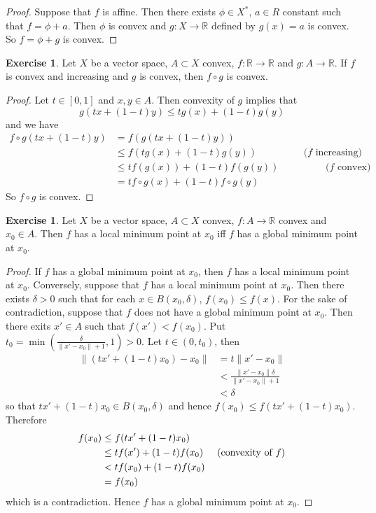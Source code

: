 \documentclass[12pt]{amsart}
\theoremstyle{definition}
\newtheorem{ex}[definition]{Exercise}
\newcommand{\del}{\delta}
\newcommand{\R}{\mathbb{R}}
\begin{document}
	\begin{proof}
	Suppose that $f$ is affine. Then there exists $\phi \in X^*$, $a \in R$ constant such that $f = \phi + a$. Then $\phi$ is convex and $g: X \rightarrow \R$ defined by $g(x) = a$ is convex. So $f = \phi + g$ is convex.
	\end{proof}
	
	\begin{ex}
	Let $X$ be a vector space, $A \subset X$ convex, $f:\R \rightarrow \R$ and $g: A \rightarrow \R$. If $f$ is convex and increasing and $g$ is convex, then $f \circ g$ is convex.
	\end{ex}	
	
	\begin{proof}
	Let $t \in [0,1]$ and $x, y \in A$. Then convexity of $g$ implies that $$g(tx +(1-t)y) \leq tg(x) + (1-t)g(y)$$ and we have
	\begin{align*}
	f\circ g(tx +(1-t)y) 
	&= f(g(tx +(1-t)y)) \\
	& \leq f(tg(x) + (1-t)g(y)) \hspace{2cm} (f \text{ increasing)}\\
	& \leq tf(g(x)) + (1-t)f(g(y)) \hspace{2cm}  (f \text{ convex)}\\	
	&= tf \circ g(x) + (1-t)f \circ g(y)
\end{align*}	 
So $f \circ g$ is convex.
	\end{proof}
	
	\begin{ex}
	Let $X$ be a vector space, $A \subset X$ convex, $f:A \rightarrow \R$ convex and $x_0 \in A$. Then $f$ has a local minimum point at $x_0$ iff $f$ has a global minimum point at $x_0$.
	\end{ex}	
	
	\begin{proof}
	If $f$ has a global minimum point at $x_0$, then $f$ has a local minimum point at $x_0$. Conversely, suppose that $f$ has a local minimum point at $x_0$. Then there exists $\del >0$ such that for each $x \in B(x_0, \del)$, $f(x_0) \leq f(x)$. For the sake of contradiction, suppose that $f$ does not have a global minimum point at $x_0$. Then there exits $x' \in A$ such that $f(x') < f(x_0)$. Put $t_0 = \min(\frac{\del}{\|x' - x_0\| + 1}, 1) >0$. Let $t \in (0, t_0)$, then
	\begin{align*}
	\|(tx' + (1-t)x_0) - x_0\| 
	&= t\|x' -x_0 \| \\
	& <   \frac{\|x' -x_0 \|\del}{\|x' -x_0\| + 1} \\
	& < \del
	\end{align*} 
	so that $tx' + (1-t)x_0 \in B(x_0, \del)$ and hence $f(x_0) \leq f(tx' + (1-t)x_0)$.  Therefore  
	\begin{align*}
	f(x_0) 
	& \leq f(tx' + (1-t)x_0) \\
	& \leq tf(x') + (1-t)f(x_0)  \hspace{.5cm} (\text{convexity of }f)\\
	& < tf(x_0) + (1-t)f(x_0) \\
	&= f(x_0)
	\end{align*}
	which is a contradiction. Hence $f$ has a global minimum point at $x_0$.
	\end{proof}
	
\end{document}
